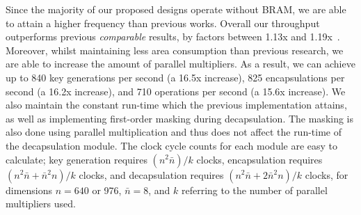 Since the majority of our proposed designs operate without BRAM, we are able to attain a higher frequency than previous works. Overall our throughput outperforms previous \emph{comparable} results, by factors between 1.13x and 1.19x~\cite{howe2018standard}. Moreover, whilst maintaining less area consumption than previous research, we are able to increase the amount of parallel multipliers. As a result, we can achieve up to 840 key generations per second (a 16.5x increase), 825 encapsulations per second (a 16.2x increase), and 710 operations per second (a 15.6x increase). We also maintain the constant run-time which the previous implementation attains, as well as implementing first-order masking during decapsulation. The masking is also done using parallel multiplication and thus does not affect the run-time of the decapsulation module. The clock cycle counts for each module are easy to calculate; key generation requires $ (n^2\bar{n}) / k$ clocks, encapsulation requires $ (n^2\bar{n} + \bar{n}^2n)/k $ clocks, and decapsulation requires $(n^2\bar{n} + 2\bar{n}^2n)/k$ clocks, for dimensions $n=640$ or 976, $\bar{n}=8$, and $k$ referring to the number of parallel multipliers used.

